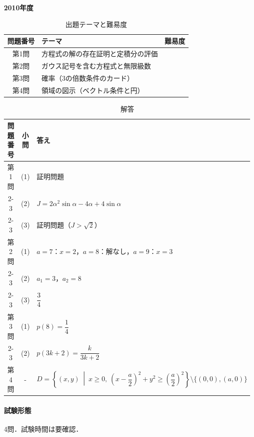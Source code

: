 \documentclass[../../main.tex]{subfiles}
\begin{document}
\begin{center}
  {\fontsize{48pt}{58pt}\selectfont \textbf{2010}\normalsize\textbf{年度}}
\end{center}

\begin{table}[htb]
  \centering
  \caption{出題テーマと難易度}
  \begin{tabular}{|c|p{9cm}|c|}
    \hline
    \textbf{問題番号} & \textbf{テーマ} & \textbf{難易度} \\
    \hline
    第1問 & 方程式の解の存在証明と定積分の評価 & \\
    \hline
    第2問 & ガウス記号を含む方程式と無限級数 & \\
    \hline
    第3問 & 確率（3の倍数条件のカード） & \\
    \hline
    第4問 & 領域の図示（ベクトル条件と円） & \\
    \hline
  \end{tabular}
\end{table}

\begin{table}[htb]
  \centering
  \caption{解答}
  \renewcommand{\arraystretch}{1.4}
  \begin{tabular}{|c|c|p{9cm}|}
    \hline
    \textbf{問題番号} & \textbf{小問} & \textbf{答え} \\
    \hline
    第1問 & (1) & 証明問題 \\
    \cline{2-3}
    & (2) & $J=2\alpha^2\sin\alpha-4\alpha+4\sin\alpha$ \\
    \cline{2-3}
    & (3) & 証明問題（$J>\sqrt{2}$） \\
    \hline
    第2問 & (1) & $a=7$：$x=2$，$a=8$：解なし，$a=9$：$x=3$ \\
    \cline{2-3}
    & (2) & $a_1=3$，$a_2=8$ \\
    \cline{2-3}
    & (3) & $\dfrac{3}{4}$ \\
    \hline
    第3問 & (1) & $p(8)=\dfrac{1}{4}$ \\
    \cline{2-3}
    & (2) & $p(3k+2)=\dfrac{k}{3k+2}$ \\
    \hline
    第4問 & - & $D=\left\{(x,y)\ \middle|\ x\ge0,\ \left(x-\dfrac{a}{2}\right)^2+y^2\ge\left(\dfrac{a}{2}\right)^2\right\}\setminus\{(0,0),(a,0)\}$ \\
    \hline
  \end{tabular}
\end{table}

\paragraph{試験形態}
4問．試験時間は要確認．
\end{document}
